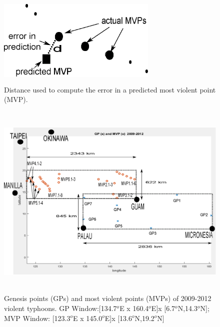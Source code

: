 \documentclass[a4paper, 12pt]{article}
\begin{document}
{\newpage
 \begin{figure}[!htpb]
 \centering
\includegraphics[width=3in,height=1.75in]{violentfig2.eps}
\caption{Distance used to compute the error in a predicted most violent point (MVP).}
\label{fig2}
\vspace{5in}
\end{figure}

\newpage

 \begin{figure}[!htpb]
 \centering
\includegraphics[width=5.5in,height=3.75in]{violentfig3.eps}
\caption{Genesis points (GPs) and most violent points (MVPs) of 2009-2012 violent typhoons. GP Window:[134.7$^o$E x 160.4$^o$E]x [6.7$^o$N,14.3$^o$N]; MVP Window: [123.3$^o$E x 145.0$^o$E]x [13.6$^o$N,19.2$^o$N]}
\vspace{5in}
\label{fig3}
\end{figure}

\newpage


}
\end{document}
